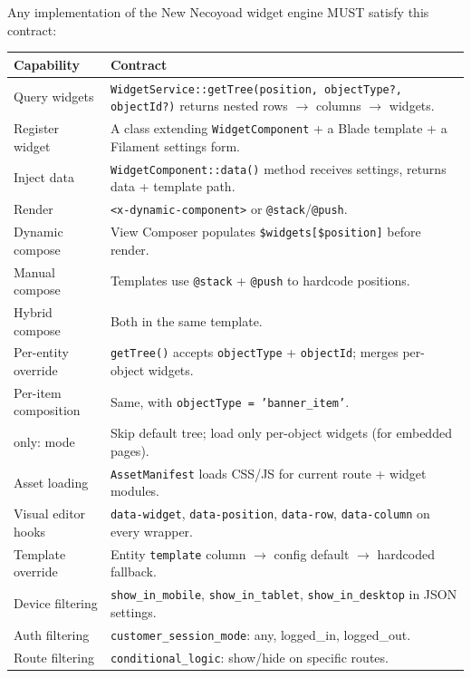 \documentclass[11pt,a4paper]{article}
\begin{document}
\begin{keybox}
Any implementation of the New Necoyoad widget engine MUST satisfy
this contract:

\begin{tabularx}{\columnwidth}{>{\raggedright\arraybackslash}p{4.0cm}X}
\toprule
\textbf{Capability} & \textbf{Contract} \\
\midrule
Query widgets & \texttt{WidgetService::getTree(position, objectType?, objectId?)} returns nested rows $\to$ columns $\to$ widgets. \\
Register widget & A class extending \texttt{WidgetComponent} + a Blade template + a Filament settings form. \\
Inject data & \texttt{WidgetComponent::data()} method receives settings, returns data + template path. \\
Render & \texttt{<x-dynamic-component>} or \texttt{@stack}/\texttt{@push}. \\
Dynamic compose & View Composer populates \texttt{\$widgets[\$position]} before render. \\
Manual compose & Templates use \texttt{@stack} + \texttt{@push} to hardcode positions. \\
Hybrid compose & Both in the same template. \\
Per-entity override & \texttt{getTree()} accepts \texttt{objectType} + \texttt{objectId}; merges per-object widgets. \\
Per-item composition & Same, with \texttt{objectType = 'banner\_item'}. \\
only: mode & Skip default tree; load only per-object widgets (for embedded pages). \\
Asset loading & \texttt{AssetManifest} loads CSS/JS for current route + widget modules. \\
Visual editor hooks & \texttt{data-widget}, \texttt{data-position}, \texttt{data-row}, \texttt{data-column} on every wrapper. \\
Template override & Entity \texttt{template} column $\to$ config default $\to$ hardcoded fallback. \\
Device filtering & \texttt{show\_in\_mobile}, \texttt{show\_in\_tablet}, \texttt{show\_in\_desktop} in JSON settings. \\
Auth filtering & \texttt{customer\_session\_mode}: any, logged\_in, logged\_out. \\
Route filtering & \texttt{conditional\_logic}: show/hide on specific routes. \\
\bottomrule
\end{tabularx}
\end{keybox}
\end{document}
